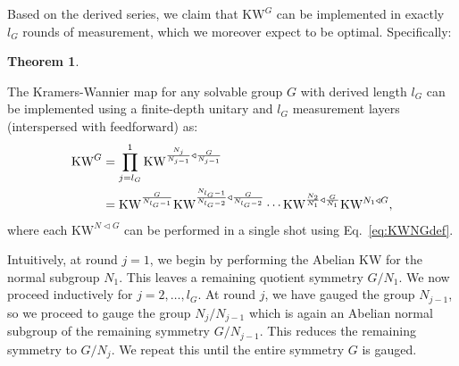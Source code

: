 \documentclass[nofootinbib,prx,twocolumn,showpacs,superscriptaddress,notitlepage,amsmath,amssymb]{revtex4-2}
\theoremstyle{definition}
\def\KW{\text{KW}}
\newtheorem{theorem}{Theorem}
\begin{document}
Based on the derived series, we claim that $\KW^G$ can be implemented in exactly $l_G$ rounds of measurement, which we moreover expect to be optimal. Specifically:
\begin{theorem}
\begin{shaded}
The Kramers-Wannier map for any solvable group $G$ with derived length $l_G$ can be implemented using a finite-depth unitary and $l_G$ measurement layers (interspersed with feedforward) as:
\begin{align}
    \KW^G &=\prod_{j=l_G}^{1} \KW^{{N_{j}\over N_{j-1}}\triangleleft{ G\over N_{j-1}}} \\
    &= \KW^{G \over N_{l_G-1}}   \KW^{{N_{l_G-1} \over N_{l_G-2}}  \triangleleft {G \over N_{l_G-2}}}   \cdots   \KW^{{N_{2} \over N_{1}}  \triangleleft {G \over N_{1}}}   \KW^{N_{1} \triangleleft G}, \nonumber \label{eq:sequentialgauging}
\end{align}
where each $\KW^{N \triangleleft G}$ can be performed in a single shot using Eq.~\eqref{eq:KWNGdef}.
\end{shaded}
\label{thm:Gsolvable}
\end{theorem}

Intuitively, at round $j=1$, we begin by performing the Abelian KW for the normal subgroup $N_{1}$. This leaves a remaining quotient symmetry $G/N_{1}$. We now proceed inductively for $j=2,\ldots, l_G$. At round $j$, we have gauged the group $N_{j-1}$, so we proceed to gauge the group $N_{j}/N_{j-1}$ which is again an Abelian normal subgroup of the remaining symmetry $G/N_{j-1}$. This reduces the remaining symmetry to $G/N_{j}$. We repeat this until the entire symmetry $G$ is gauged.
\end{document}
